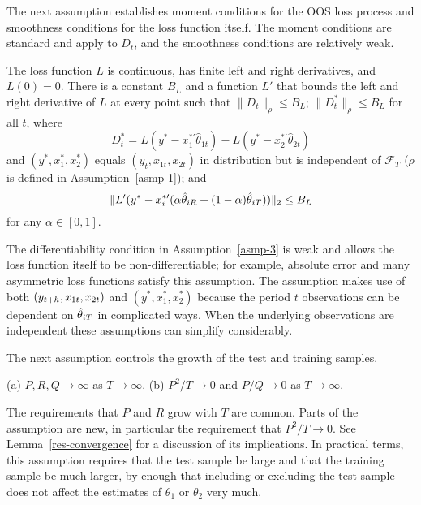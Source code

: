 \documentclass[12pt,draft]{article}
\begin{document}
The next assumption establishes moment conditions for the OOS loss
process and smoothness conditions for the loss function itself. The
moment conditions are standard and apply to $D_t$, and the smoothness
conditions are relatively weak.

\begin{asmp}\label{asmp-3}
  The loss function $L$ is continuous, has finite left and right
  derivatives, and $L(0) = 0$.  There is a constant $B_L$ and a
  function $L'$ that bounds the left and right derivative of $L$ at
  every point such that $\|D_t\|_\rho \leq B_L$; $\|D_t^*\|_\rho \leq
  B_L$ for all $t$, where
  \begin{equation}
    D_t^* = L(y^* - x_1^{*\prime}\hat\theta_{1t})
    - L(y^* - x_2^{*\prime}\hat\theta_{2t})
  \end{equation}
  and $(y^*, x_1^*, x_2^*)$ equals $(y_t, x_{1t}, x_{2t})$ in
  distribution but is independent of $\mathcal{F}_T$ ($\rho$ is defined
  in Assumption~\ref{asmp-1}); and
  \begin{equation}\label{eq:29}
    \| L'(y^* - x_{i}^{*\prime} (\alpha \hat\theta_{iR} + (1-\alpha) \hat\theta_{iT})) \|_2
    \leq B_L
  \end{equation}
  for any $\alpha \in [0,1]$.
\end{asmp}

The differentiability condition in Assumption~\ref{asmp-3} is weak and
allows the loss function itself to be non-differentiable; for example,
absolute error and many asymmetric loss functions satisfy this
assumption. The assumption makes use of both $(y_{t+h}, x_{1t},
x_{2t})$ and $(y^*, x_1^*, x_2^*)$ because the period $t$ observations
can be dependent on $\hat\theta_{iT}$ in complicated ways. When the underlying
observations are independent these assumptions can simplify
considerably.

The next assumption controls the growth of the test and
training samples.
\begin{asmp} \label{asmp-4} (a) $P, R, Q \to\infty$ as $T \to
  \infty$. (b) $P^2/T \to 0$ and $P/Q \to 0$ as $T \to \infty$.
\end{asmp}

The requirements that $P$ and $R$ grow with $T$ are common. Parts of
the assumption are new, in particular the requirement that $P^2/T \to
0$.  See Lemma~\ref{res-convergence} for a discussion of its
implications.  In practical terms, this assumption requires that the
test sample be large and that the training sample be much larger, by
enough that including or excluding the test sample does not affect the
estimates of $\theta_1$ or $\theta_2$ very much.
\end{document}
